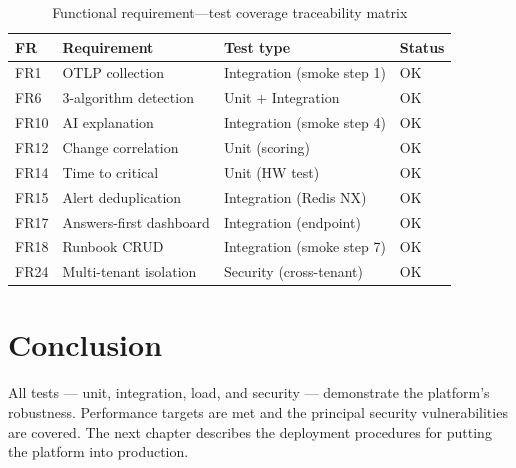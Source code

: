 \begin{table}[H]
\centering
\caption{Functional requirement—test coverage traceability matrix}
\label{tab:traceability-tests}
\small
\begin{tabularx}{\textwidth}{lXll}
\toprule
\textbf{FR} & \textbf{Requirement} & \textbf{Test type} & \textbf{Status} \\
\midrule
FR1  & OTLP collection           & Integration (smoke step 1) & \textcolor{SuccessGreen}{OK} \\
FR6  & 3-algorithm detection     & Unit + Integration          & \textcolor{SuccessGreen}{OK} \\
FR10 & AI explanation            & Integration (smoke step 4)  & \textcolor{SuccessGreen}{OK} \\
FR12 & Change correlation        & Unit (scoring)              & \textcolor{SuccessGreen}{OK} \\
FR14 & Time to critical          & Unit (HW test)              & \textcolor{SuccessGreen}{OK} \\
FR15 & Alert deduplication       & Integration (Redis NX)      & \textcolor{SuccessGreen}{OK} \\
FR17 & Answers-first dashboard   & Integration (endpoint)      & \textcolor{SuccessGreen}{OK} \\
FR18 & Runbook CRUD              & Integration (smoke step 7)  & \textcolor{SuccessGreen}{OK} \\
FR24 & Multi-tenant isolation    & Security (cross-tenant)     & \textcolor{SuccessGreen}{OK} \\
\bottomrule
\end{tabularx}
\end{table}

\section*{Conclusion}

All tests — unit, integration, load, and security — demonstrate the platform's
robustness. Performance targets are met and the principal security vulnerabilities
are covered. The next chapter describes the deployment procedures for putting
the platform into production.
